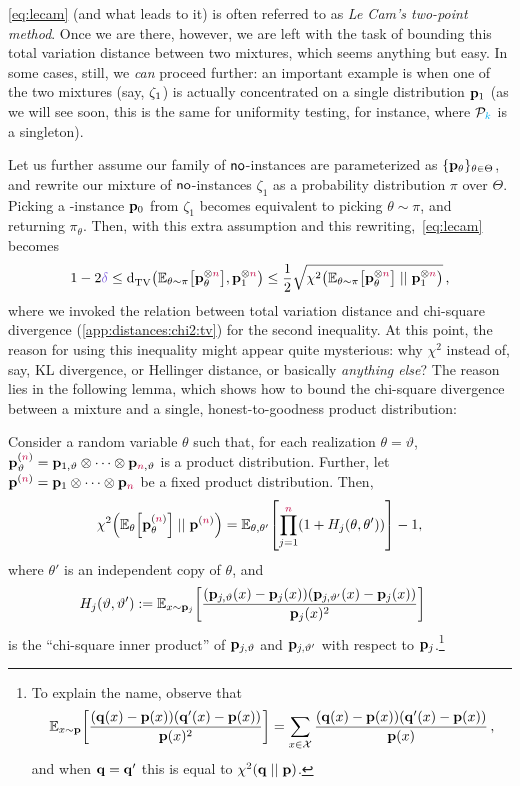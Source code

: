 \cref{eq:lecam} (and what leads to it) is often referred to as \emph{Le Cam's two-point method}. Once we are there, however, we are left with the task of bounding this total variation distance between two mixtures, which seems anything but easy. In some cases, still, we \emph{can} proceed further: an important example is when one of the two mixtures (say, $\zeta_1$) is actually concentrated on a single distribution $\mathbf{p}_1$ (as we will see soon, this is the same for uniformity testing, for instance, where $\mathcal{P}_{\textcolor{cyan}{k}}$ is a singleton). 

Let us further assume our family of ${\sf{}no}$-instances are parameterized as $\{\mathbf{p}_\theta\}_{\theta\in\Theta}$, and rewrite our mixture of ${\sf{}no}$-instances $\zeta_1$ as a probability distribution $\pi$ over $\Theta$. Picking a \no-instance $\mathbf{p}_0$ from $\zeta_1$ becomes equivalent to picking $\theta\sim\pi$, and returning $\pi_\theta$. Then, with this extra assumption and this rewriting,~\cref{eq:lecam} becomes
\begin{equation}
	\label{eq:lecam:simpler}
	1-2\errprob \leq \totalvardist{\bE{\theta\sim\pi}{\p_\theta^{\otimes\ns}}}{\p_\accept^{\otimes\ns}}
	\leq \frac{1}{2}\sqrt{\chisquare{\bE{\theta\sim\pi}{\p_\theta^{\otimes\ns}}}{\p_\accept^{\otimes\ns}}}\,,
\end{equation}
where we invoked the relation between total variation distance and chi-square divergence (\cref{app:distances:chi2:tv}) for the second inequality. At this point, the reason for using this inequality might appear quite mysterious: why $\chi^2$ instead of, say, KL divergence, or Hellinger distance, or basically \emph{anything else}? The reason lies in the following lemma, which shows how to bound the chi-square divergence between a mixture and a single, honest-to-goodness product distribution:
\begin{lemma}
	\label{lemma:ingster}
Consider a random variable $\theta$ such that, for each realization
$\theta=\vartheta$, $\mathbf{p}_\vartheta^{({\textcolor{purple}{n}})}=\mathbf{p}_{1,\vartheta} \otimes \dots \otimes \mathbf{p}_{{\textcolor{purple}{n}},\vartheta}$ is a product distribution. Further, let
$\mathbf{p}^{({\textcolor{purple}{n}})} = \mathbf{p}_1 \otimes \dots \otimes \mathbf{p}_{\textcolor{purple}{n}}$ be a fixed product
distribution. Then,
\[
\chisquare{\bE{\theta}{\p_\theta^{(\ns)}} }{ \p^{(\ns)} } = \bE{\theta,\theta'}{\prod_{j=1}^\ns (1+{H_j(\theta,\theta')})} - 1,
\]
where $\theta'$ is an independent copy of $\theta$, and
\begin{align*}
H_{j}(\vartheta,\vartheta') &\eqdef \bE{x\sim\p_j}{\frac{(\p_{j,\vartheta}(x)-\p_j(x))(\p_{j,\vartheta'}(x)-\p_j(x))}{\p_j(x)^2}}%
\end{align*}
is the ``chi-square inner product'' of $\mathbf{p}_{j,\vartheta}$ and $\mathbf{p}_{j,\vartheta'}$ with respect to $\mathbf{p}_j$.\footnote{To explain the name, observe that
\[
\bE{x\sim\p}{\frac{(\q(x)-\p(x))(\q'(x)-\p(x))}{\p(x)^2}}=\sum_{x\in\domain} \frac{(\q(x)-\p(x))(\q'(x)-\p(x))}{\p(x)}\,,
\] and when $\mathbf{q}=\mathbf{q}'$ this is equal to $\chisquare{\q}{\p}$.}
\end{lemma}

